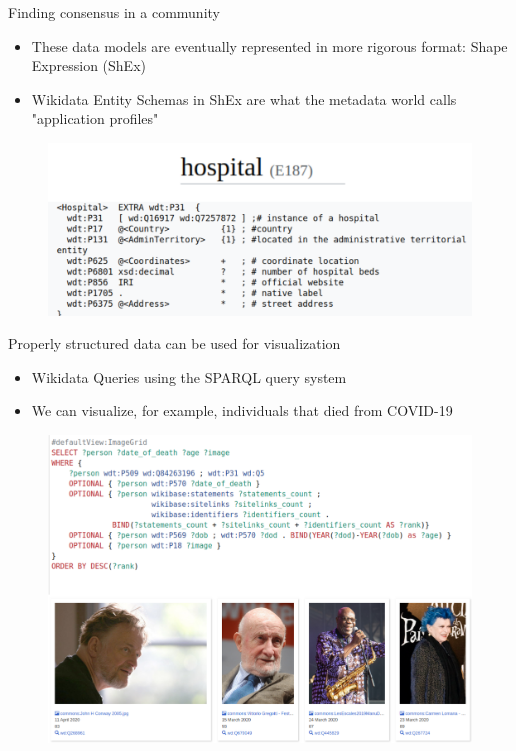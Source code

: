 \documentclass{beamer}
\begin{document}
\begin{frame}{Finding consensus in a community}
\begin{itemize}
    \item These data models are eventually represented in more rigorous format: Shape Expression (ShEx)
    \item Wikidata Entity Schemas in ShEx are what the metadata world calls "application profiles"
\end{itemize}
\begin{figure}
\includegraphics[scale=0.65]{fig/shex_hospitals.png}
\end{figure}
\end{frame}




\begin{frame}{Properly structured data can be used for visualization}
\begin{itemize}
    \item Wikidata Queries using the SPARQL query system 
    \item We can visualize, for example, individuals that died from COVID-19
\end{itemize}
\begin{figure}
\includegraphics[scale=0.65]{fig/covid19_deaths.png}
\end{figure}
\end{frame}
\end{document}
